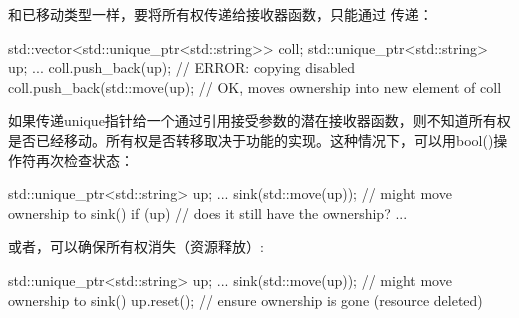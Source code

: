 和已移动类型一样，要将所有权传递给接收器函数，只能通过  传递：

\begin{cppcode}
std::vector<std::unique_ptr<std::string>> coll;
std::unique_ptr<std::string> up;
...
coll.push_back(up); // ERROR: copying disabled
coll.push_back(std::move(up); // OK, moves ownership into new element of coll
\end{cppcode}

如果传递unique指针给一个通过引用接受参数的潜在接收器函数，则不知道所有权是否已经移动。所有权是否转移取决于功能的实现。这种情况下，可以用bool()操作符再次检查状态：

\begin{cppcode}
std::unique_ptr<std::string> up;
...
sink(std::move(up)); // might move ownership to sink()
if (up) { // does it still have the ownership?
	...
}
\end{cppcode}

或者，可以确保所有权消失（资源释放）:

\begin{cppcode}
std::unique_ptr<std::string> up;
...
sink(std::move(up)); // might move ownership to sink()
up.reset(); // ensure ownership is gone (resource deleted)
\end{cppcode}













